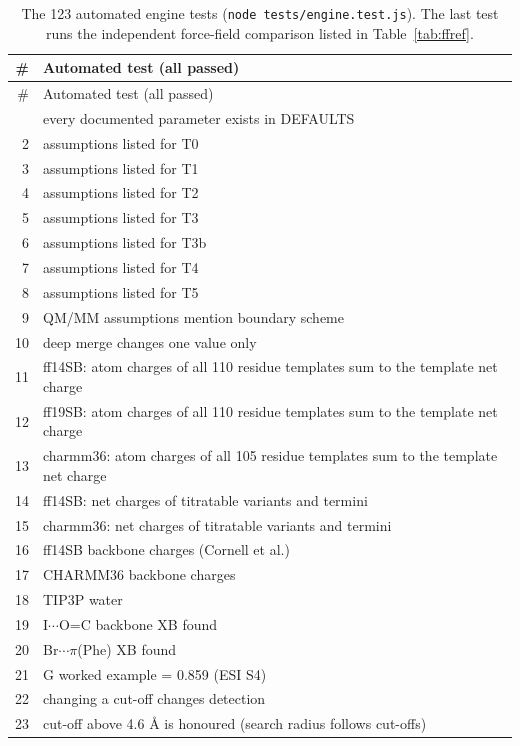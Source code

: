 \documentclass[journal=jcisd8,manuscript=suppinfo]{achemso}
\begin{document}
\begin{singlespace}
{\scriptsize
\setlength{\tabcolsep}{3pt}
\begin{longtable}{rp{14.5cm}}
\caption{The 123 automated engine tests (\texttt{node tests/engine.test.js}). The last test runs the independent force-field comparison listed in Table~\ref{tab:ffref}.}\label{tab:tests}\\
\toprule
\# & Automated test (all passed)\\
\midrule
\endfirsthead
\toprule
\# & Automated test (all passed)\\
\midrule
\endhead
\bottomrule
\endlastfoot
1 & every documented parameter exists in DEFAULTS\\
2 & assumptions listed for T0\\
3 & assumptions listed for T1\\
4 & assumptions listed for T2\\
5 & assumptions listed for T3\\
6 & assumptions listed for T3b\\
7 & assumptions listed for T4\\
8 & assumptions listed for T5\\
9 & QM/MM assumptions mention boundary scheme\\
10 & deep merge changes one value only\\
11 & ff14SB: atom charges of all 110 residue templates sum to the template net charge\\
12 & ff19SB: atom charges of all 110 residue templates sum to the template net charge\\
13 & charmm36: atom charges of all 105 residue templates sum to the template net charge\\
14 & ff14SB: net charges of titratable variants and termini\\
15 & charmm36: net charges of titratable variants and termini\\
16 & ff14SB backbone charges (Cornell et al.)\\
17 & CHARMM36 backbone charges\\
18 & TIP3P water\\
19 & I$\cdots$O=C backbone XB found\\
20 & Br$\cdots\pi$(Phe) XB found\\
21 & G worked example = 0.859 (ESI S4)\\
22 & changing a cut-off changes detection\\
23 & cut-off above 4.6 \AA{} is honoured (search radius follows cut-offs)\\

\end{longtable}}
\end{singlespace}
\end{document}
